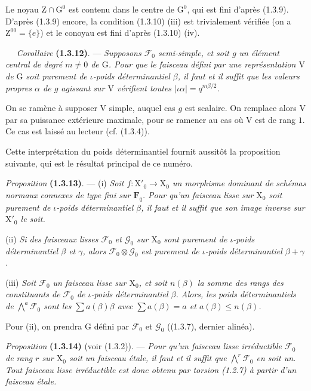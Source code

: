 \documentclass[11pt,leqno]{article}
\newcommand{\Page}[1]{\ifvmode\noindent\else\unskip\ \fi{\footnotesize\textcolor{gray}{[p.\,#1]}}\ \ignorespaces}
\begin{document}
Le noyau \(\mathrm{Z}\cap\mathrm{G}^0\) est contenu dans le centre de \(\mathrm{G}^0\), qui est fini d’après (1.3.9). D’après (1.3.9) encore, la condition (1.3.10) (iii) est trivialement vérifiée (on a \(\mathrm{Z}^{00}=\{e\}\)) et le conoyau est fini d’après (1.3.10) (iv).

\Page{161}
\textit{Corollaire} \textbf{(1.3.12)}. — \textit{Supposons \(\mathcal{F}_0\) semi-simple, et soit \(g\) un élément central de degré \(m\ne0\) de \(\mathrm{G}\). Pour que le faisceau défini par une représentation \(\mathrm{V}\) de \(\mathrm{G}\) soit purement de \(\iota\)-poids déterminantiel \(\beta\), il faut et il suffit que les valeurs propres \(\alpha\) de \(g\) agissant sur \(\mathrm{V}\) vérifient toutes \(|\iota\alpha|=q^{m\beta/2}\).}

On se ramène à supposer \(\mathrm{V}\) simple, auquel cas \(g\) est scalaire. On remplace alors \(\mathrm{V}\) par sa puissance extérieure maximale, pour se ramener au cas où \(\mathrm{V}\) est de rang \(1\). Ce cas est laissé au lecteur (cf. (1.3.4)).

Cette interprétation du poids déterminantiel fournit aussitôt la proposition suivante, qui est le résultat principal de ce numéro.

\textit{Proposition} \textbf{(1.3.13)}. — (i) \textit{Soit \(f:\mathrm{X}'_0\to\mathrm{X}_0\) un morphisme dominant de schémas normaux connexes de type fini sur \(\mathbf{F}_q\). Pour qu’un faisceau lisse sur \(\mathrm{X}_0\) soit purement de \(\iota\)-poids déterminantiel \(\beta\), il faut et il suffit que son image inverse sur \(\mathrm{X}'_0\) le soit.}

(ii) \textit{Si des faisceaux lisses \(\mathcal{F}_0\) et \(\mathcal{G}_0\) sur \(\mathrm{X}_0\) sont purement de \(\iota\)-poids déterminantiel \(\beta\) et \(\gamma\), alors \(\mathcal{F}_0\otimes\mathcal{G}_0\) est purement de \(\iota\)-poids déterminantiel \(\beta+\gamma\).}

(iii) \textit{Soit \(\mathcal{F}_0\) un faisceau lisse sur \(\mathrm{X}_0\), et soit \(n(\beta)\) la somme des rangs des constituants de \(\mathcal{F}_0\) de \(\iota\)-poids déterminantiel \(\beta\). Alors, les poids déterminantiels de \(\bigwedge\limits^a\mathcal{F}_0\) sont les \(\sum a(\beta)\beta\) avec \(\sum a(\beta)=a\) et \(a(\beta)\le n(\beta)\).}

Pour (ii), on prendra \(\mathrm{G}\) défini par \(\mathcal{F}_0\) et \(\mathcal{G}_0\) ((1.3.7), dernier alinéa).

\textit{Proposition} \textbf{(1.3.14)} (voir (1.3.2)). — \textit{Pour qu’un faisceau lisse irréductible \(\mathcal{F}_0\) de rang \(r\) sur \(\mathrm{X}_0\) soit un faisceau étale, il faut et il suffit que \(\bigwedge\limits^r\mathcal{F}_0\) en soit un. Tout faisceau lisse irréductible est donc obtenu par torsion \textup{(1.2.7)} à partir d’un faisceau étale.}
\end{document}
